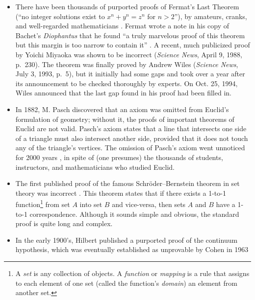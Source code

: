 \begin{itemize}
\item There have been thousands of purported proofs of Fermat's Last
Theorem (``no integer solutions exist to $x^n +
y^n = z^n$ for $n > 2$''), by amateurs, cranks, and well-regarded
mathematicians \cite[p.~5]{Stark}.  Fermat wrote a note
in his copy of Bachet's {\em Diophantus} that he found ``a truly marvelous
proof of this theorem but this margin is too narrow to contain it''
\cite[p.~507]{Kramer}.  A recent, much publicized proof by Yoichi
Miyaoka was shown to be incorrect ({\em Science News},
April 9, 1988, p.~230).  The theorem was finally proved by Andrew
Wiles ({\em Science News}, July 3, 1993, p.~5), but it
initially had some gaps and took over a year after its announcement to be
checked thoroughly by experts.  On Oct. 25, 1994, Wiles announced that the last
gap found in his proof had been filled in.
  \item In 1882, M. Pasch discovered that an axiom was omitted from Euclid's
formulation of geometry; without it, the proofs of
important theorems of Euclid are not valid.  Pasch's axiom states that a line that intersects one side of a triangle must also
intersect another side, provided that it does not touch any of the triangle's
vertices.  The omission of Pasch's axiom went unnoticed for 2000
years \cite[p.~160]{Davis}, in spite of (one presumes) the thousands of
students, instructors, and mathematicians who studied Euclid.
  \item The first published proof of the famous Schr\"{o}der--Bernstein
theorem in set theory was incorrect
\cite[p.~148]{Enderton}.  This theorem states
that if there exists a 1-to-1 function\footnote{A {\em set} is any
collection of objects. A {\em function} or {\em
mapping} is a rule that assigns to each element of one set
(called the function's {\em domain}) an element from another
set.} from set $A$ into set $B$ and vice-versa, then sets $A$ and $B$ have
a 1-to-1 correspondence.  Although it sounds simple and obvious,
the standard proof is quite long and complex.
  \item In the early 1900's, Hilbert published a
purported proof of the continuum hypothesis, which
was eventually established as unprovable by Cohen in 1963

\end{itemize}
